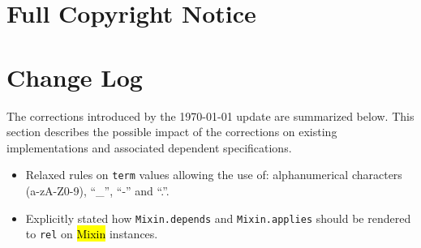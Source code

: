 \documentclass[10pt,a4paper]{article}
\begin{document}
\section{Full Copyright Notice}





\appendix

\newpage
\section{Change Log}
\label{sec:change_log}

The corrections introduced by the {\today} update are summarized below.
This section describes the possible impact of the corrections on existing
implementations and associated dependent specifications.

\begin{itemize}
  \item Relaxed rules on {\tt term} values allowing the use of: alphanumerical characters (a-zA-Z0-9),
        ``\_'', ``-'' and ``.''.
  \item Explicitly stated how {\tt Mixin.depends} and {\tt Mixin.applies} should be rendered to {\tt rel}
        on \hl{Mixin} instances.
\end{itemize}
\end{document}
